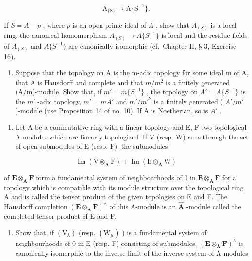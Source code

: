 \[
\mathrm{A} _ {\{\mathrm{S} \}} \rightarrow \mathrm{A} \{\mathrm{S} ^ {- 1} \}.
\]

If \(S = A - p\) , where \(p\) is an open prime ideal of \(A\) , show that \(A_{(S)}\) is a local ring, the canonical homomorphism \(A_{(S)} \to A\{S^{-1}\}\) is local and the residue fields of \(A_{(S)}\) and \(A\{S^{-1}\}\) are canonically isomorphic (cf.~Chapter II, § 3, Exercise 16).

\begin{enumerate}
\def\labelenumi{(\alph{enumi})}
\setcounter{enumi}{7}
\tightlist
\item
  Suppose that the topology on A is the m-adic topology for some ideal m of A, that A is Hausdorff and complete and that \(m/m^{2}\) is a finitely generated (A/m)-module. Show that, if \(m' = m\{S^{-1}\}\) , the topology on \(A' = A\{S^{-1}\}\) is the \(m'\) -adic topology, \(m' = mA'\) and \(m'/m'^{2}\) is a finitely generated ( \(A'/m'\) )-module (use Proposition 14 of no. 10). If A is Noetherian, so is \(A'\) .
\end{enumerate}

\begin{enumerate}
\def\labelenumi{\arabic{enumi}.}
\setcounter{enumi}{27}
\tightlist
\item
  Let A be a commutative ring with a linear topology and E, F two topological A-modules which are linearly topologized. If V (resp. W) runs through the set of open submodules of E (resp. F), the submodules
\end{enumerate}

\[
\operatorname{Im} (\mathrm{V} \otimes_ {\mathbf {A}} \mathrm{F}) + \operatorname{Im} (\mathrm{E} \otimes_ {\mathbf {A}} \mathrm{W})
\]

of \(\mathbf{E} \otimes_{\mathbf{A}} \mathbf{F}\) form a fundamental system of neighbourhoods of 0 in \(\mathbf{E} \otimes_{\mathbf{A}} \mathbf{F}\) for a topology which is compatible with its module structure over the topological ring A and is called the tensor product of the given topologies on E and F. The Hausdorff completion \((\mathbf{E} \otimes_{\mathbf{A}} \mathbf{F})^{\wedge}\) of this A-module is an \(\hat{\mathbf{A}}\) -module called the completed tensor product of E and F.

\begin{enumerate}
\def\labelenumi{(\alph{enumi})}
\tightlist
\item
  Show that, if \((\mathrm{V}_{\lambda})\) (resp. \((\mathrm{W}_{\mu})\) ) is a fundamental system of neighbourhoods of 0 in E (resp. F) consisting of submodules, \((\mathbf{E} \otimes_{\mathbf{A}} \mathbf{F})^{\wedge}\) is canonically isomorphic to the inverse limit of the inverse system of A-modules
\end{enumerate}

